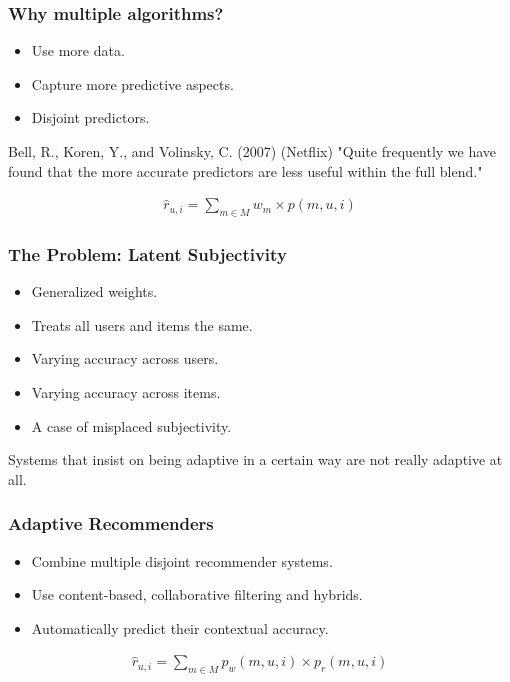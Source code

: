 \documentclass[screen]{beamer}
\begin{document}
\begin{frame}
  \frametitle{Why multiple algorithms?}
  \begin{itemize}
    \item Use more data.
    \item Capture more predictive aspects.
    \item Disjoint predictors.
  \end{itemize}
  
  \begin{block}{Bell, R., Koren, Y., and Volinsky, C. (2007) (Netflix)}
    "Quite frequently we have found that the more accurate predictors are less useful within the full blend."
  \end{block}
\end{frame}

\begin{frame}
  \begin{eqnarray*}
    \hat{r}_{u,i} = \sum_{m \in M} w_{m} \times p(m,u,i)
  \end{eqnarray*}
\end{frame}

\begin{frame}
  \frametitle{The Problem: Latent Subjectivity}
  \begin{itemize}
    \item Generalized weights.
    \item Treats all users and items the same.
    \item Varying accuracy across users.
    \item Varying accuracy across items.
    \item A case of misplaced subjectivity.
  \end{itemize}
\end{frame}

\begin{frame}
  \huge
  \linespread{1.6}
  Systems that insist on being adaptive in a certain way
  are not really adaptive at all.
\end{frame}

\begin{frame}
  \frametitle{Adaptive Recommenders}
  \begin{itemize}
    \item Combine multiple disjoint recommender systems.
    \item Use content-based, collaborative filtering and hybrids.
    \item Automatically predict their contextual accuracy.
  \end{itemize}
  \begin{eqnarray}
    \hat{r}_{u,i} = \sum_{m \in M} p_{w}(m,u,i) \times p_{r}(m,u,i)
  \end{eqnarray}
\end{frame}
\end{document}
